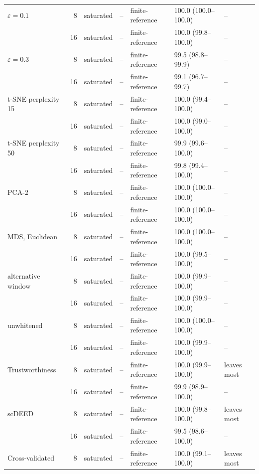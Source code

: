 \documentclass[11pt]{article}
\begin{document}
{\begin{longtable}{>{\raggedright\arraybackslash}p{3.0cm}rl>{\raggedright\arraybackslash}p{2.3cm}>{\raggedright\arraybackslash}p{2.1cm}ll}
\addlinespace
$\varepsilon=0.1$ & 8 & saturated & -- & finite-reference & 100.0 (100.0--100.0) & -- \\
 & 16 & saturated & -- & finite-reference & 100.0 (99.8--100.0) & -- \\
\addlinespace
$\varepsilon=0.3$ & 8 & saturated & -- & finite-reference & 99.5 (98.8--99.9) & -- \\
 & 16 & saturated & -- & finite-reference & 99.1 (96.7--99.7) & -- \\
\addlinespace
t-SNE perplexity 15 & 8 & saturated & -- & finite-reference & 100.0 (99.4--100.0) & -- \\
 & 16 & saturated & -- & finite-reference & 100.0 (99.0--100.0) & -- \\
\addlinespace
t-SNE perplexity 50 & 8 & saturated & -- & finite-reference & 99.9 (99.6--100.0) & -- \\
 & 16 & saturated & -- & finite-reference & 99.8 (99.4--100.0) & -- \\
\addlinespace
PCA-2 & 8 & saturated & -- & finite-reference & 100.0 (100.0--100.0) & -- \\
 & 16 & saturated & -- & finite-reference & 100.0 (100.0--100.0) & -- \\
\addlinespace
MDS, Euclidean & 8 & saturated & -- & finite-reference & 100.0 (100.0--100.0) & -- \\
 & 16 & saturated & -- & finite-reference & 100.0 (99.5--100.0) & -- \\
\addlinespace
alternative window & 8 & saturated & -- & finite-reference & 100.0 (99.9--100.0) & -- \\
 & 16 & saturated & -- & finite-reference & 100.0 (99.9--100.0) & -- \\
\addlinespace
unwhitened & 8 & saturated & -- & finite-reference & 100.0 (100.0--100.0) & -- \\
 & 16 & saturated & -- & finite-reference & 100.0 (99.9--100.0) & -- \\
\addlinespace
Trustworthiness & 8 & saturated & -- & finite-reference & 100.0 (99.9--100.0) & leaves most \\
 & 16 & saturated & -- & finite-reference & 99.9 (98.9--100.0) & -- \\
\addlinespace
scDEED & 8 & saturated & -- & finite-reference & 100.0 (99.8--100.0) & leaves most \\
 & 16 & saturated & -- & finite-reference & 99.5 (98.6--100.0) & -- \\
\addlinespace
Cross-validated & 8 & saturated & -- & finite-reference & 100.0 (99.1--100.0) & leaves most \\

\end{longtable}}
\end{document}
